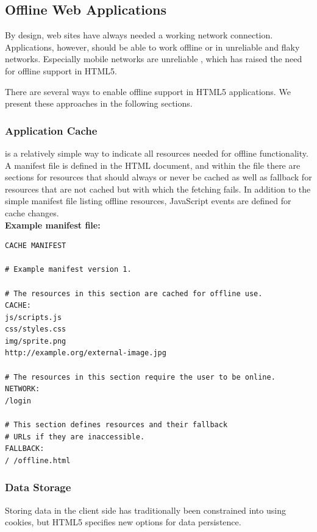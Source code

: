 \subsection{Offline Web Applications}

By design, web sites have always needed a working network
connection. Applications, however, should be able to work offline or
in unreliable and flaky networks. Especially mobile networks are
unreliable \cite{zandy2002reliable}, which has raised the need for
offline support in HTML5.

There are several ways to enable offline support in HTML5
applications. We present these approaches in the following sections.

\subsubsection{Application Cache}
\label{section:appcache}

 is a relatively simple way to indicate all resources
needed for offline functionality. A manifest file is defined in the
HTML document, and within the file there are sections for resources
that should always or never be cached as well as fallback 
for resources that are not cached but with which the fetching
fails. In addition to the simple manifest file listing offline
resources, JavaScript events are defined for cache
changes. \cite{HTML5draft} \\

\noindent \textbf{Example manifest file:}
\begin{verbatim}
CACHE MANIFEST

# Example manifest version 1.

# The resources in this section are cached for offline use.
CACHE:
js/scripts.js
css/styles.css
img/sprite.png
http://example.org/external-image.jpg

# The resources in this section require the user to be online.
NETWORK:
/login

# This section defines resources and their fallback
# URLs if they are inaccessible.
FALLBACK:
/ /offline.html
\end{verbatim}

\subsubsection{Data Storage}
\label{section:datastorage}

Storing data in the client side has traditionally been constrained
into using cookies, but HTML5 specifies new options for data
persistence.

